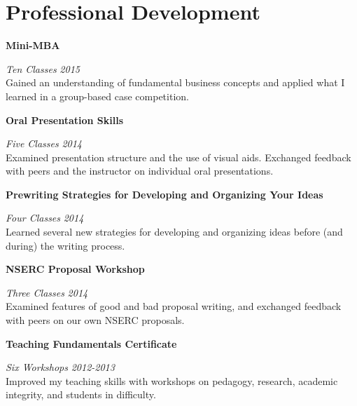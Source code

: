 \section{\sc Professional Development}



{\bf Mini-MBA}
\vspace{-.3cm}

{\em Ten Classes} \hfill {\em 2015}\\
Gained an understanding of fundamental business concepts and applied what I learned in a group-based case competition.

{\bf Oral Presentation Skills}
\vspace{-.3cm}

{\em Five Classes} \hfill {\em 2014}\\
Examined presentation structure and the use of visual aids. Exchanged feedback with peers and the instructor on individual oral presentations.

{\bf Prewriting Strategies for Developing and Organizing Your Ideas}
\vspace{-.3cm}

{\em Four Classes} \hfill {\em 2014}\\
Learned several new strategies for developing and organizing ideas before (and during) the writing process.

{\bf NSERC Proposal Workshop}
\vspace{-.3cm}

{\em Three Classes} \hfill {\em 2014}\\
Examined features of good and bad proposal writing, and exchanged feedback with peers on our own NSERC proposals. 

{\bf Teaching Fundamentals Certificate}
\vspace{-.3cm}

{\em Six Workshops} \hfill {\em 2012-2013}\\
Improved my teaching skills with workshops on pedagogy, research, academic integrity, and students in difficulty.